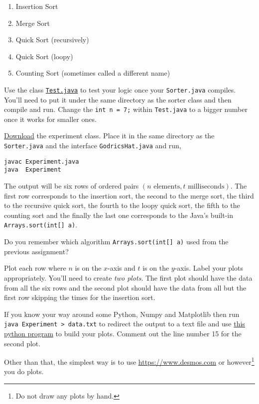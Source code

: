 \documentclass{homework}
\newcommand\download{\href{%
    https://tashfeen.org/s/ds/Experiment.java%
  }{Download}}
\begin{document}
\begin{enumerate}
  \item Insertion Sort
  \item Merge Sort
  \item Quick Sort (recursively)
  \item Quick Sort (loopy)
  \item Counting Sort (sometimes called a different name)
\end{enumerate}

Use the class
\href{https://tashfeen.org/s/ds/Test.java}{\texttt{Test.java}}
to test your logic once your \texttt{Sorter.java} compiles. You'll
need to put it under the same directory as the sorter class and
then compile and run. Change the \texttt{int n = 7;} within
\texttt{Test.java} to a bigger number once it works for smaller
ones.

\question\label{plot} \download{} the experiment class. Place it in
the same directory as the \texttt{Sorter.java} and the interface
\texttt{GodricsHat.java} and run,
\begin{verbatim}
javac Experiment.java
java  Experiment
\end{verbatim}

The output will be six rows of ordered pairs $(n \text{ elements},
  t \text{ milliseconds})$. The first row corresponds to the
insertion sort, the second to the merge sort, the third to the
recursive quick sort, the fourth to the loopy quick sort, the
fifth to the counting sort and the finally the last one
corresponds to the Java's built-in \texttt{Arrays.sort(int[] a)}.

Do you remember which algorithm \texttt{Arrays.sort(int[] a)} used
from the previous assignment?

Plot each row where $n$ is on the $x$-axis and $t$ is on the
$y$-axis. Label your plots appropriately. You'll need to create
\textit{two plots}. The first plot should have the data from all
the six rows and the second plot should have the data from all but
the first row \ie skipping the times for the insertion sort.

If you know your way around some Python, Numpy and Matplotlib then
run \texttt{java Experiment > data.txt} to redirect the output to
a text file and use
\href{https://tashfeen.org/s/ds/plot.py}{this python
  program} to build your plots. Comment out the line number 15 for
the second plot.

Other than that, the simplest way is to use
\url{https://www.desmos.com} or however\footnote{Do not draw any
  plots by hand.} you do plots.
\end{document}
